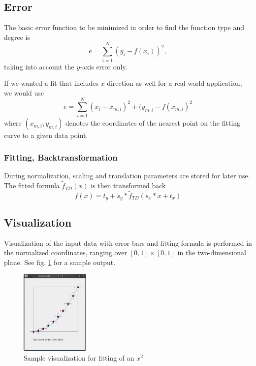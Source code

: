 \documentclass[useAMS,usenatbib]{templates/mn2e}
\begin{document}
\subsection{Error}
The basic error function to be minimized in order to find the function
type and degree is
%
\begin{equation}
  e=\sum_{i=1}^N (y_i-f(x_i))^2,
\end{equation}
%
taking into account the $y$-axis error only.

If we wanted a fit that includes $x$-direction as well for a
real-world application, we would use
%
\begin{equation}
  e=\sum_{i=1}^N (x_i-x_{m,i})^2+(y_{m,i}-f(x_{m,i})^2
\end{equation}
%
where $(x_{m,i},y_{m,i})$ denotes the coordinates of the nearest point
on the fitting curve to a given data point.
%
\subsubsection{Fitting, Backtransformation}
During normalization, scaling and translation parameters are stored
for later use. The fitted formula $\tilde{f}_{TD}(x)$ is then transformed back
%
\begin{equation}
  f(x)=t_y+s_y*\tilde{f}_{TD}(s_x*x+t_x)
\end{equation}
%
%
\subsection{Visualization}
Visualization of the input data with error bars and fitting formula is
performed in the normalized coordinates, ranging over
$[0,1]\times[0,1]$ in the two-dimensional plane. See
fig. \ref{fig:vis} for a sample output.
%
\begin{figure}
  \begin{center}
    \includegraphics[width=0.3\textwidth]{fig/vis.eps}
  \end{center}
  \caption{\label{fig:vis}Sample visualization for fitting of an $x^2$}
\end{figure}
\end{document}
